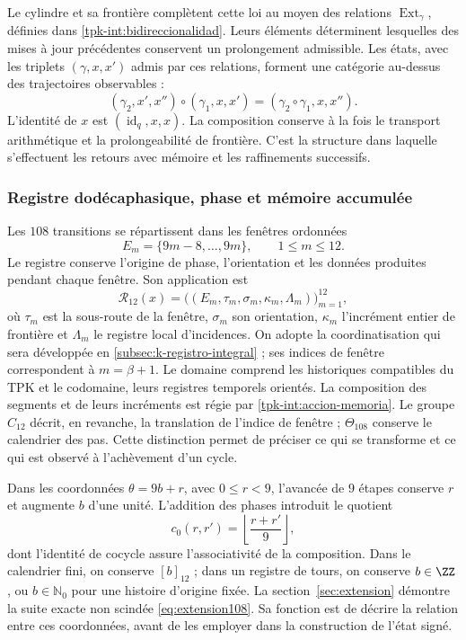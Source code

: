 Le cylindre et sa frontière complètent cette loi au moyen des relations
\(\operatorname{Ext}_\gamma\), définies dans
\ref{tpk-int:bidireccionalidad}. Leurs éléments déterminent lesquelles
des mises à jour précédentes conservent un prolongement admissible.
Les états, avec les triplets \((\gamma,x,x')\) admis par
ces relations, forment une catégorie au-dessus des trajectoires observables :
\[
 (\gamma_2,x',x'')\circ(\gamma_1,x,x')
     =(\gamma_2\circ\gamma_1,x,x'').
\]
L'identité de \(x\) est \((\operatorname{id}_q,x,x)\). La composition conserve à la fois le transport arithmétique et la prolongeabilité de frontière. C'est la structure dans laquelle s'effectuent les retours avec mémoire et les raffinements successifs.

\subsubsection{Registre dodécaphasique, phase et mémoire accumulée}
\label{tpk-int:dodecafase}

Les \(108\) transitions se répartissent dans les fenêtres ordonnées
\[
 E_m=\{9m-8,\ldots,9m\},\qquad 1\leq m\leq12.
\]
Le registre conserve l'origine de phase, l'orientation et les données
produites pendant chaque fenêtre. Son application est
\[
 \mathcal R_{12}(x)=
 \bigl((E_m,\tau_m,\sigma_m,\kappa_m,\Lambda_m)\bigr)_{m=1}^{12},
\]
où \(\tau_m\) est la sous-route de la fenêtre, \(\sigma_m\) son
orientation, \(\kappa_m\) l'incrément entier de frontière et
\(\Lambda_m\) le registre local d'incidences. On adopte la coordinatisation
qui sera développée en \ref{subsec:k-registro-integral} ; ses indices
de fenêtre correspondent à \(m=\beta+1\).
Le domaine comprend les historiques compatibles
du TPK et le codomaine, leurs registres temporels orientés. La
composition des segments et de leurs incréments est régie par
\eqref{tpk-int:accion-memoria}. Le groupe \(C_{12}\) décrit, en
revanche, la translation de l'indice de fenêtre ; \(\Theta_{108}\) conserve
le calendrier des pas. Cette distinction permet de préciser ce qui se transforme
et ce qui est observé à l'achèvement d'un cycle.

Dans les coordonnées \(\theta=9b+r\), avec \(0\leq r<9\), l'avancée
de \(9\) étapes conserve \(r\) et augmente \(b\) d'une unité.
L'addition des phases introduit le quotient
\[
 c_0(r,r')=\left\lfloor\frac{r+r'}9\right\rfloor,
\]
dont l'identité de cocycle assure l'associativité de la composition. Dans le calendrier fini, on conserve \([b]_{12}\) ; dans un registre de tours, on conserve \(b\in\ZZ\), ou \(b\in\mathbb N_0\) pour une histoire d'origine fixée. La section~\ref{sec:extension} démontre la suite exacte non scindée \eqref{eq:extension108}. Sa fonction est de décrire la relation entre ces coordonnées, avant de les employer dans la construction de l'état signé.

